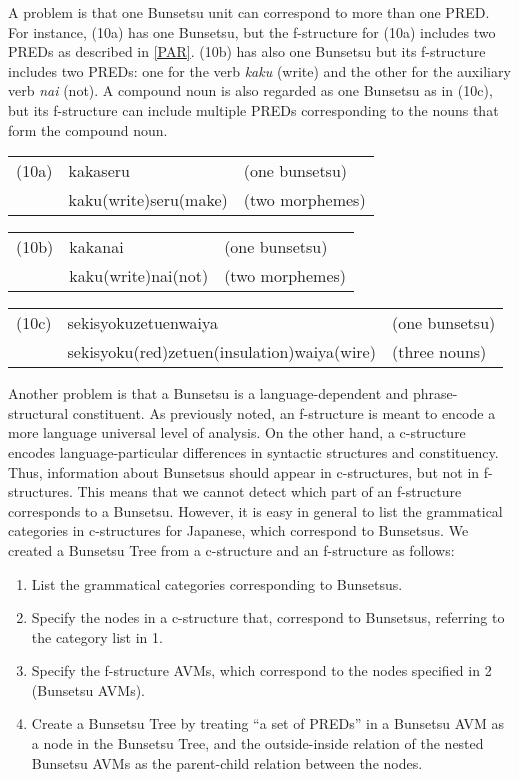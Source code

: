 \documentclass[english]{jnlp_1.4_rep}
\begin{document}
A problem is that one Bunsetsu unit can correspond to more than one
PRED.  For instance, (10a) has one Bunsetsu, but the f-structure for
(10a) includes two PREDs as described in \ref{PAR}.  (10b) has also one
Bunsetsu but its f-structure includes two PREDs: one for the verb
\textit{kaku} (write) and the other for the auxiliary verb
\textit{nai} (not).  A compound noun is also regarded as one Bunsetsu
as in (10c), but its f-structure can include multiple PREDs
corresponding to the nouns that form the compound noun.

\vspace{2pt}
\noindent
\begin{tabular}{ll@{ }l}
(10a) & kakaseru&(one bunsetsu)\\
      & kaku(write)\enskip seru(make)&(two morphemes)
\end{tabular}

\noindent
\begin{tabular}{ll@{ }l}
(10b) & kakanai&(one bunsetsu)\\
      & kaku(write)\enskip nai(not)&(two morphemes)
\end{tabular}

\noindent
\begin{tabular}{ll@{ }l}
(10c) & sekisyokuzetuenwaiya&(one bunsetsu)\\
      & sekisyoku(red)\enskip zetuen(insulation)\enskip waiya(wire)&(three nouns)
\end{tabular}

Another problem is that a Bunsetsu is a language-dependent and phrase-structural constituent.  As previously noted, an f-structure is meant
to encode a more language universal level of analysis.  On the other
hand, a c-structure encodes language-particular differences in
syntactic structures and constituency.  Thus, information about
Bunsetsus should appear in c-structures, but not in f-structures.
This means that we cannot detect which part of an f-structure
corresponds to a Bunsetsu.  However, it is easy in general to list the
grammatical categories in c-structures for Japanese, which correspond
to Bunsetsus.  We created a Bunsetsu Tree from a c-structure and an
f-structure as follows:

\begin{enumerate}
\item
List the grammatical categories corresponding to Bunsetsus.
\item
Specify the nodes in a c-structure that, correspond to Bunsetsus, referring to the category list in 1.
\item
Specify the f-structure AVMs, which correspond to the nodes specified in 2 (Bunsetsu AVMs).
\item
Create a Bunsetsu Tree by treating ``a set of PREDs'' in a Bunsetsu AVM as a node in the Bunsetsu Tree, and the outside-inside relation of the nested Bunsetsu AVMs as the parent-child relation between the nodes.
\end{enumerate}  
\end{document}
